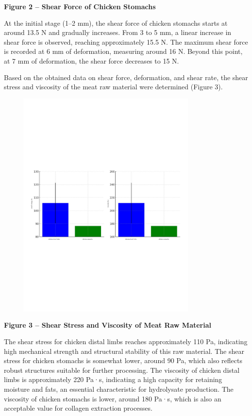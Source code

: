 {\bfseries Figure 2 -- Shear Force of Chicken Stomachs}

At the initial stage (1--2 mm), the shear force of chicken stomachs
starts at around 13.5 N and gradually increases. From 3 to 5 mm, a
linear increase in shear force is observed, reaching approximately 15.5
N. The maximum shear force is recorded at 6 mm of deformation, measuring
around 16 N. Beyond this point, at 7 mm of deformation, the shear force
decreases to 15 N.

Based on the obtained data on shear force, deformation, and shear rate,
the shear stress and viscosity of the meat raw material were determined
(Figure 3).

\begin{figure}[H]
	\centering
	\includegraphics[width=0.8\textwidth]{media/pish/image11}
	\caption*{}
\end{figure}


{\bfseries Figure 3 -- Shear Stress and Viscosity of Meat Raw Material}

The shear stress for chicken distal limbs reaches approximately 110 Pa,
indicating high mechanical strength and structural stability of this raw
material. The shear stress for chicken stomachs is somewhat lower,
around 90 Pa, which also reflects robust structures suitable for further
processing. The viscosity of chicken distal limbs is approximately 220
Pa·s, indicating a high capacity for retaining moisture and fats, an
essential characteristic for hydrolysate production. The viscosity of
chicken stomachs is lower, around 180 Pa·s, which is also an acceptable
value for collagen extraction processes.

